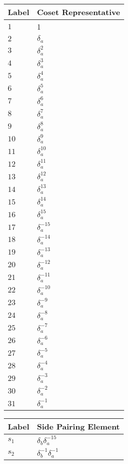 \documentclass{article}
\begin{document}
\begin{center}
\begin{tabular}{ll}
\toprule
Label & Coset Representative\\
\midrule
$1$ & 1 \\
$2$ & $\delta_a^{}$ \\
$3$ & $\delta_a^{2}$ \\
$4$ & $\delta_a^{3}$ \\
$5$ & $\delta_a^{4}$ \\
$6$ & $\delta_a^{5}$ \\
$7$ & $\delta_a^{6}$ \\
$8$ & $\delta_a^{7}$ \\
$9$ & $\delta_a^{8}$ \\
$10$ & $\delta_a^{9}$ \\
$11$ & $\delta_a^{10}$ \\
$12$ & $\delta_a^{11}$ \\
$13$ & $\delta_a^{12}$ \\
$14$ & $\delta_a^{13}$ \\
$15$ & $\delta_a^{14}$ \\
$16$ & $\delta_a^{15}$ \\
$17$ & $\delta_a^{-15}$ \\
$18$ & $\delta_a^{-14}$ \\
$19$ & $\delta_a^{-13}$ \\
$20$ & $\delta_a^{-12}$ \\
$21$ & $\delta_a^{-11}$ \\
$22$ & $\delta_a^{-10}$ \\
$23$ & $\delta_a^{-9}$ \\
$24$ & $\delta_a^{-8}$ \\
$25$ & $\delta_a^{-7}$ \\
$26$ & $\delta_a^{-6}$ \\
$27$ & $\delta_a^{-5}$ \\
$28$ & $\delta_a^{-4}$ \\
$29$ & $\delta_a^{-3}$ \\
$30$ & $\delta_a^{-2}$ \\
$31$ & $\delta_a^{-1}$ \\
\bottomrule
\end{tabular}
\hfill
\begin{tabular}{ll}
\toprule
Label & Side Pairing Element\\
\midrule
$s_{1}$ & $\delta_b^{}\delta_a^{-15}$ \\
$s_{2}$ & $\delta_b^{-1}\delta_a^{-1}$ \\

\end{tabular}
\end{center}
\end{document}
